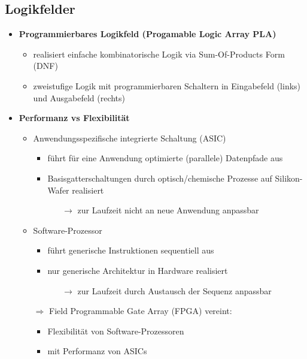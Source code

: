 \documentclass[11pt,a4paper]{article}
\begin{document}
\subsection{Logikfelder}
\begin{itemize}

\item \textbf{Programmierbares Logikfeld (Progamable Logic Array PLA)}
	\begin{itemize}
	\item realisiert einfache kombinatorische Logik via Sum-Of-Products Form (DNF)
	\item zweistufige Logik mit programmierbaren Schaltern in Eingabefeld (links) und Ausgabefeld (rechts)
	\end{itemize}
	
\item \textbf{Performanz vs Flexibilität}
	\begin{itemize}
	\item Anwendungsspezifische integrierte Schaltung (ASIC)
		\begin{itemize}
		\item führt für eine Anwendung optimierte (parallele) Datenpfade aus
		\item Basisgatterschaltungen durch optisch/chemische Prozesse auf Silikon-Wafer realisiert
			\begin{itemize}
			\item[$\rightarrow$] zur Laufzeit nicht an neue Anwendung anpassbar
			\end{itemize}
		\end{itemize}
	\item Software-Prozessor
		\begin{itemize}
		\item führt generische Instruktionen sequentiell aus
		\item nur generische Architektur in Hardware realisiert
			\begin{itemize}
			\item[$\rightarrow$] zur Laufzeit durch Austausch der Sequenz anpassbar
			\end{itemize}
		\end{itemize}
	\item[$\Rightarrow$] Field Programmable Gate Array (FPGA) vereint:
		\begin{itemize}
		\item Flexibilität von Software-Prozessoren
		\item mit Performanz von ASICs
		\end{itemize}
	\end{itemize}
	

\end{itemize}
\end{document}
